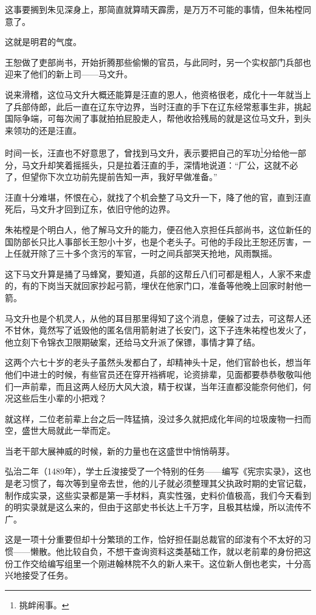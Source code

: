 \begin{multicols}{\theparacolNo}
		这事要搁到朱见深身上，那简直就算晴天霹雳，是万万不可能的事情，但朱祐樘同意了。

		这就是明君的气度。

		王恕做了吏部尚书，开始折腾那些偷懒的官员，与此同时，另一个实权部门兵部也迎来了他们的新上司——马文升。

		说来滑稽，这位马文升大概还能算是汪直的恩人，他资格很老，成化十一年就当上了兵部侍郎，此后一直在辽东守边界，当时汪直的手下在辽东经常惹事生非，挑起国际争端，可每次闹了事就拍拍屁股走人，帮他收拾残局的就是这位马文升，到头来领功的还是汪直。

		时间一长，汪直也不好意思了，曾找到马文升，表示要把自己的军功\footnote{挑衅闹事。}分给他一部分，马文升却笑着摇摇头，只是拉着汪直的手，深情地说道：“厂公，这就不必了，但望你下次立功前先提前告知一声，我好早做准备。”

		汪直十分难堪，怀恨在心，就找了个机会整了马文升一下，降了他的官，直到汪直死后，马文升才回到辽东，依旧守他的边界。

		朱祐樘是个明白人，他了解马文升的能力，便召他入京担任兵部尚书，这位新任的国防部长只比人事部长王恕小十岁，也是个老头子。可他的手段比王恕还厉害，一上任就开除了三十多个贪污的军官，一时之间兵部哭天抢地，风雨飘摇。

		这下马文升算是捅了马蜂窝，要知道，兵部的这帮丘八们可都是粗人，人家不来虚的，有的下岗当天就回家抄起弓箭，埋伏在他家门口，准备等他晚上回家时射他一箭。

		马文升也是个机灵人，从他的耳目那里得知了这个消息，便躲了过去，可这帮人还不甘休，竟然写了诋毁他的匿名信用箭射进了长安门，这下子连朱祐樘也发火了，他立刻下令锦衣卫限期破案，还给马文升派了保镖，事情才算了结。

		这两个六七十岁的老头子虽然头发都白了，却精神头十足，他们官龄也长，想当年他们中进士的时候，有些官员还在穿开裆裤呢，论资排辈，见面都要恭恭敬敬叫他们一声前辈，而且这两人经历大风大浪，精于权谋，当年汪直都没能奈何他们，何况这些后生小辈的小把戏？

		就这样，二位老前辈上台之后一阵猛搞，没过多久就把成化年间的垃圾废物一扫而空，盛世大局就此一举而定。

		当老干部大展神威的时候，新的力量也在这盛世中悄悄萌芽。

		弘治二年（1489年），学士丘浚接受了一个特别的任务——编写《宪宗实录》，这也是老习惯了，每次等到皇帝去世，他的儿子就必须整理其父执政时期的史官记载，制作成实录，这些实录都是第一手材料，真实性强，史料价值极高，我们今天看到的明实录就是这么来的，但由于这部史书长达上千万字，且极其枯燥，所以流传不广。

		这是一项十分重要但却十分繁琐的工作，恰好担任副总裁官的邱浚有个不太好的习惯——懒散。他比较自负，不想干查询资料这类基础工作，就以老前辈的身份把这份工作交给编写组里一个刚进翰林院不久的新人来干。这位新人倒也老实，十分高兴地接受了任务。


\end{multicols}
